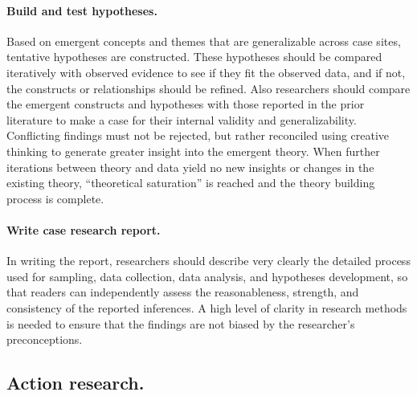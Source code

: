 \paragraph{Build and test hypotheses.} Based on emergent concepts and themes that are generalizable across case sites, tentative hypotheses are constructed. These hypotheses should be compared iteratively with observed evidence to see if they fit the observed data, and if not, the constructs or relationships should be refined. Also researchers should compare the emergent constructs and hypotheses with those reported in the prior literature to make a case for their internal validity and generalizability. Conflicting findings must not be rejected, but rather reconciled using creative thinking to generate greater insight into the emergent theory. When further iterations between theory and data yield no new insights or changes in the existing theory, ``theoretical saturation'' is reached and the theory building process is complete.

\paragraph{Write case research report.} In writing the report, researchers should describe very clearly the detailed process used for sampling, data collection, data analysis, and hypotheses development, so that readers can independently assess the reasonableness, strength, and consistency of the reported inferences. A high level of clarity in research methods is needed to ensure that the findings are not biased by the researcher's preconceptions.

\subsection{Action research.} 

